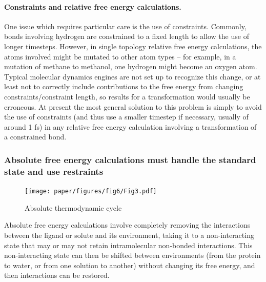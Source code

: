 \documentclass[9pt,bestpractices]{livecoms}
\begin{document}
\paragraph{Constraints and relative free energy calculations.}
One issue which requires particular care is the use of constraints.
Commonly, bonds involving hydrogen are constrained to a fixed length to allow the use of longer timesteps.
However, in single topology relative free energy calculations, the atoms involved might be mutated to other atom types -- for example, in a mutation of methane to methanol, one hydrogen might become an oxygen atom.
Typical molecular dynamics engines are not set up to recognize this change, or at least not to correctly include contributions to the free energy from changing constraints/constraint length, so results for a transformation would usually be erroneous.
At present the most general solution to this problem is simply to avoid the use of constraints (and thus use a smaller timestep if necessary, usually of around 1 fs) in any relative free energy calculation involving a transformation of a constrained bond.

\subsubsection*{Absolute free energy calculations must handle the standard state and use restraints}
\label{sec:standardstate-restraints}



\begin{figure}
    \texttt{[image: paper/figures/fig6/Fig3.pdf]}
    \caption{Absolute thermodynamic cycle}
    \label{fig:absolute-thermodynamic-cycle}
\end{figure}

Absolute free energy calculations involve completely removing the interactions between the ligand or solute and its environment, taking it to a non-interacting state that may or may not retain intramolecular non-bonded interactions.
This non-interacting state can then be shifted between environments (from the protein to water, or from one solution to another) without changing its free energy, and then interactions can be restored.
\end{document}
